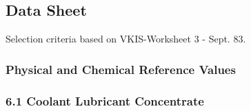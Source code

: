 \subsection{Data Sheet}

\setcounter{page}{2}

Selection criteria based on VKIS-Worksheet 3 - Sept. 83.

\subsubsection*{Physical and Chemical Reference Values}

\subsubsection*{6.1 Coolant Lubricant Concentrate}

